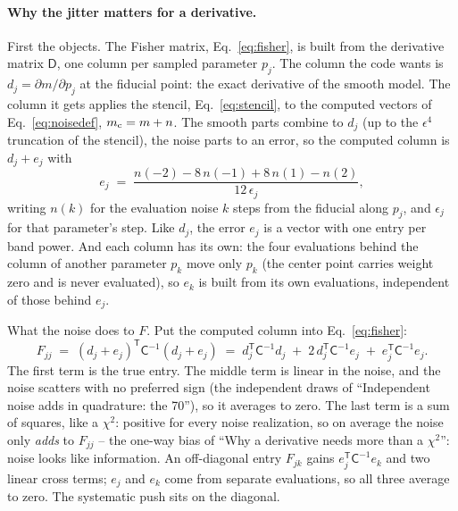 \documentclass[11pt]{article}
\newcommand{\Cov}{\mathsf{C}}
\newcommand{\T}{^{\mathsf{T}}}
\newcommand{\mD}{\mathsf{D}}
\begin{document}
\paragraph{Why the jitter matters for a derivative.}
First the objects.  The Fisher matrix, Eq.~\eqref{eq:fisher}, is built
from the derivative matrix $\mD$, one column per sampled parameter
$p_j$.  The column the code wants is $d_j = \partial m/\partial p_j$
at the fiducial point: the exact derivative of the smooth model.  The
column it gets applies the stencil, Eq.~\eqref{eq:stencil}, to the
computed vectors of Eq.~\eqref{eq:noisedef}, $m_{\rm c} = m + n$.  The
smooth parts combine to $d_j$ (up to the $\epsilon^4$ truncation of
the stencil), the noise parts to an error, so the computed column is
$d_j + e_j$ with
\begin{equation}
  e_j \;=\; \frac{n(-2) - 8\,n(-1) + 8\,n(1) - n(2)}{12\,\epsilon_j},
  \label{eq:ejdef}
\end{equation}
writing $n(k)$ for the evaluation noise $k$ steps from the fiducial
along $p_j$, and $\epsilon_j$ for that parameter's step.  Like $d_j$,
the error $e_j$ is a vector with one entry per band power.  And each
column has its own: the four evaluations behind the column of another
parameter $p_k$ move only $p_k$ (the center point carries weight zero
and is never evaluated), so $e_k$ is built from its own evaluations,
independent of those behind $e_j$.

What the noise does to $F$.  Put the computed column into
Eq.~\eqref{eq:fisher}:
\begin{equation}
  F_{jj} \;=\; (d_j + e_j)\T\Cov^{-1}(d_j + e_j)
  \;=\; d_j\T\Cov^{-1}d_j \;+\; 2\,d_j\T\Cov^{-1}e_j
  \;+\; e_j\T\Cov^{-1}e_j .
  \label{eq:fjjnoise}
\end{equation}
The first term is the true entry.  The middle term is linear in the
noise, and the noise scatters with no preferred sign (the independent
draws of ``Independent noise adds in quadrature: the 70''), so it
averages to zero.  The last term is a sum of squares, like a $\chi^2$:
positive for every noise realization, so on average the noise only
\emph{adds} to $F_{jj}$ -- the one-way bias of ``Why a derivative
needs more than a $\chi^2$'': noise looks like information.  An
off-diagonal entry $F_{jk}$ gains $e_j\T\Cov^{-1}e_k$ and two linear
cross terms; $e_j$ and $e_k$ come from separate evaluations, so all
three average to zero.  The systematic push sits on the diagonal.
\end{document}
